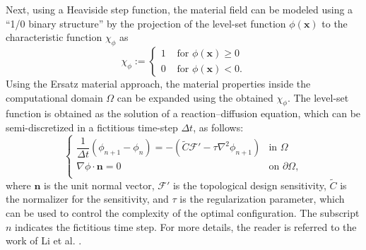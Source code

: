 \begin{subappendices}
Next, using a Heaviside step function, the material field can be modeled using a ``1/0 binary structure'' by the projection of the level-set function $\phi(\mathbf{x})$ to the characteristic function $\chi_{\phi}$ as
\begin{equation}
	\chi_{\phi} :=\left\{\begin{array}{ll}
		{1} & {\text { for } \phi\left( \boldsymbol{x} \right) \geq 0} \\
		{0} & {\text { for } \phi\left( \boldsymbol{x} \right)<0}.
		\label{eq: characteristic function}
	\end{array}\right.
\end{equation}
Using the Ersatz material approach, the material properties inside the computational domain $\Omega$ can be expanded using the obtained $\chi_{\phi}$. The level-set function is obtained as the solution of a reaction--diffusion equation, which can be semi-discretized in a fictitious time-step $\Delta t$, as follows:
\begin{equation}
	\left\{\begin{array}{ll}
		\dfrac{1}{\Delta t} \left( \phi_{n+1} - \phi_{n} \right) =- \left( \tilde{C} \mathcal{F}' -\tau \nabla^{2} \phi_{n+1} \right) & \text{in }\Omega\\
		\nabla \phi \cdot \boldsymbol{n} = 0 & \text{on } \partial\Omega, \\
	\end{array}\right.
	\label{eq: reaction diffusion equation semi discretize}
\end{equation}
where $\boldsymbol{n}$ is the unit normal vector, $\mathcal{F}'$ is the topological design sensitivity, $\tilde{C}$ is the normalizer for the sensitivity, and $\tau$ is the regularization parameter, which can be used to control the complexity of the optimal configuration. The subscript $n$ indicates the fictitious time step. For more details, the reader is referred to the work of Li et al. \cite{li2021full}. 


\end{subappendices}
